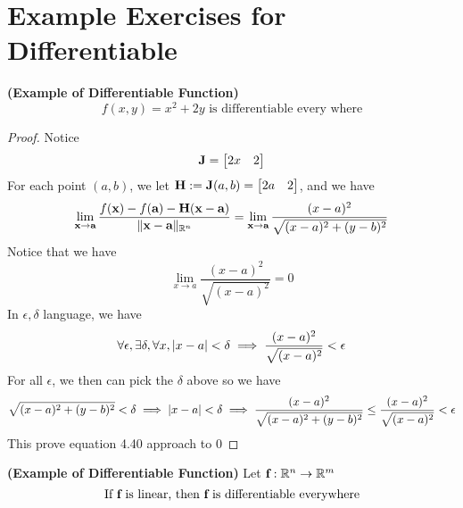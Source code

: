 \documentclass{report}
\begin{document}
\section{Example Exercises for Differentiable}
\begin{theorem}
\label{4.3.1}
\textbf{(Example of Differentiable Function)} 
\begin{equation}
f(x,y)=x^2+2y\text{ is differentiable every where}
\end{equation}
\end{theorem}
\begin{proof}
Notice 
\begin{equation}
\textbf{J}=\begin{bmatrix}
  2x&2
\end{bmatrix}
\end{equation}
For each point $(a,b)$, we let $\textbf{H}:=\textbf{J}(a,b)=\begin{bmatrix}
  2a&2
\end{bmatrix}$, and we have
\begin{equation}
\lim_{\textbf{x}\to \textbf{a}}\frac{f(\textbf{x})-f(\textbf{a})-\textbf{H}(\textbf{x}-\textbf{a})}{\| \textbf{x}-\textbf{a} \|_{\mathbb{R}^n}}=\lim_{\textbf{x}\to \textbf{a}}\frac{(x-a)^2}{\sqrt{(x-a)^2+(y-b)^2}}
\end{equation}
Notice that we have
\begin{equation}
\lim_{x\to a}\frac{(x-a)^2}{\sqrt{(x-a)^2} }=0
\end{equation}
In $\epsilon,\delta$ language, we have
\begin{equation}
\forall \epsilon,\exists \delta, \forall x, |x-a|<\delta \implies \frac{(x-a)^2}{\sqrt{(x-a)^2} }<\epsilon  
\end{equation}
For all $\epsilon $, we then can pick the $\delta$ above so we have
\begin{equation}
\sqrt{(x-a)^2+(y-b)^2}<\delta \implies |x-a|<\delta\implies \frac{(x-a)^2}{\sqrt{(x-a)^2+(y-b)^2} }\leq  \frac{(x-a)^2}{\sqrt{(x-a)^2} } <\epsilon 
\end{equation}
This prove equation 4.40 approach to 0
\end{proof}
\begin{theorem}
\label{4.3.2}
\textbf{(Example of Differentiable Function)} Let $\textbf{f}:\mathbb{R}^n\rightarrow \mathbb{R}^m$ 
\begin{equation}
\text{ If $\textbf{f}$ is linear, then $\textbf{f}$ is differentiable everywhere }
\end{equation}
\end{theorem}
\end{document}
